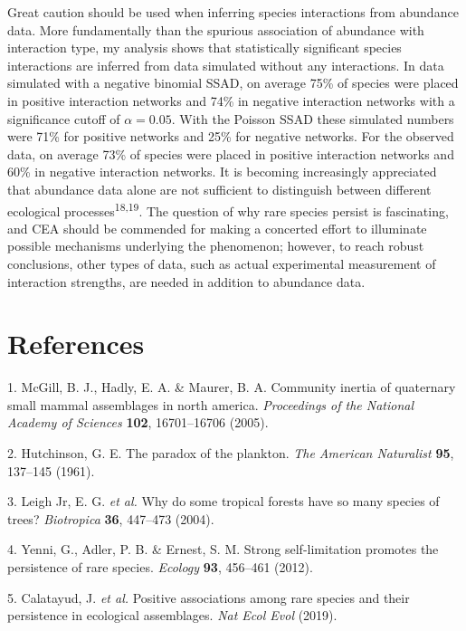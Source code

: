 \documentclass[]{article}
\begin{document}
Great caution should be used when inferring species interactions from
abundance data. More fundamentally than the spurious association of
abundance with interaction type, my analysis shows that statistically
significant species interactions are inferred from data simulated
without any interactions. In data simulated with a negative binomial
SSAD, on average 75\% of species were placed in positive interaction
networks and 74\% in negative interaction networks with a significance
cutoff of \(\alpha = 0.05\). With the Poisson SSAD these simulated
numbers were 71\% for positive networks and 25\% for negative networks.
For the observed data, on average 73\% of species were placed in
positive interaction networks and 60\% in negative interaction networks.
It is becoming increasingly appreciated that abundance data alone are
not sufficient to distinguish between different ecological
processes\textsuperscript{18,19}. The question of why rare species
persist is fascinating, and CEA should be commended for making a
concerted effort to illuminate possible mechanisms underlying the
phenomenon; however, to reach robust conclusions, other types of data,
such as actual experimental measurement of interaction strengths, are
needed in addition to abundance data.

\clearpage

\section*{References}\label{references}

\hypertarget{refs}{}
\hypertarget{ref-mcgill2005}{}
1. McGill, B. J., Hadly, E. A. \& Maurer, B. A. Community inertia of
quaternary small mammal assemblages in north america. \emph{Proceedings
of the National Academy of Sciences} \textbf{102}, 16701--16706 (2005).

\hypertarget{ref-hutchinson1961}{}
2. Hutchinson, G. E. The paradox of the plankton. \emph{The American
Naturalist} \textbf{95}, 137--145 (1961).

\hypertarget{ref-leigh2004}{}
3. Leigh Jr, E. G. \emph{et al.} Why do some tropical forests have so
many species of trees? \emph{Biotropica} \textbf{36}, 447--473 (2004).

\hypertarget{ref-yenni2012}{}
4. Yenni, G., Adler, P. B. \& Ernest, S. M. Strong self-limitation
promotes the persistence of rare species. \emph{Ecology} \textbf{93},
456--461 (2012).

\hypertarget{ref-calatayud2019}{}
5. Calatayud, J. \emph{et al.} Positive associations among rare species
and their persistence in ecological assemblages. \emph{Nat Ecol Evol}
(2019).
\end{document}
